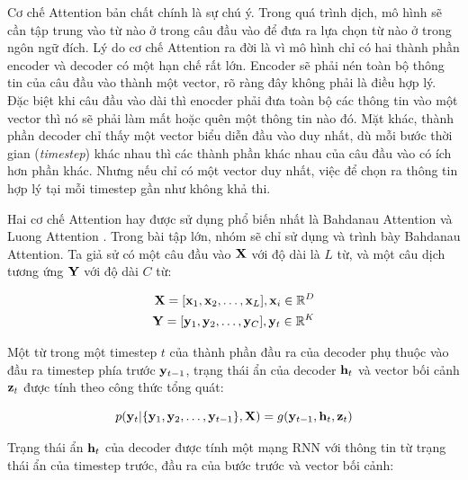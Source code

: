 \documentclass[14pt, a4paper]{article}
\numberwithin{equation}{section}
\numberwithin{algorithm}{section}
\numberwithin{figure}{section}
\numberwithin{table}{section}
\numberwithin{dl}{section}
\numberwithin{md}{section}
\numberwithin{bd}{section}
\numberwithin{dn}{section}
\numberwithin{hq}{section}
\begin{document}
    Cơ chế Attention bản chất chính là sự chú ý. Trong quá trình dịch, mô hình sẽ cần tập trung vào từ nào ở trong câu đầu vào để đưa ra lựa chọn từ nào ở trong ngôn ngữ đích.
    Lý do cơ chế Attention ra đời là vì mô hình chỉ có hai thành phần encoder và decoder có một hạn chế rất lớn. Encoder sẽ phải nén toàn bộ thông tin của câu đầu vào thành một vector, rõ ràng đây không phải là điều hợp lý.
    Đặc biệt khi câu đầu vào dài thì enocder phải đưa toàn bộ các thông tin vào một vector thì nó sẽ phải làm mất hoặc quên một thông tin nào đó.
    Mặt khác, thành phần decoder chỉ thấy một vector biểu diễn đầu vào duy nhất, dù mỗi bước thời gian (\textit{timestep}) khác nhau thì các thành phần khác nhau của câu đầu vào có ích hơn phần khác.
    Nhưng nếu chỉ có một vector duy nhất, việc để chọn ra thông tin hợp lý tại mỗi timestep gần như không khả thi.

    Hai cơ chế Attention hay được sử dụng phổ biến nhất là Bahdanau Attention \cite{bahdanau2014neural} và Luong Attention \cite{luong2014addressing}. Trong bài tập lớn, nhóm sẽ chỉ sử dụng và trình bày Bahdanau Attention.
    Ta giả sử có một câu đầu vào $\bold{X}$ với độ dài là $L$ từ, và một câu dịch tương ứng $\bold{Y}$ với độ dài $C$ từ:

    \begin{equation}
        \begin{aligned}
            \bold{X} = \lbrack \bold{x}_1, \bold{x}_2, \dots, \bold{x}_L \rbrack, \bold{x}_i \in \mathbb{R}^D \\
            \bold{Y} = \lbrack \bold{y}_1, \bold{y}_2, \dots, \bold{y}_C \rbrack, \bold{y}_t \in \mathbb{R}^K
        \end{aligned}
    \end{equation}

    Một từ trong một timestep $t$ của thành phần đầu ra của decoder phụ thuộc vào đầu ra timestep phía trước $\bold{y}_{t-1}$, trạng thái ẩn của decoder $\bold{h}_t$ và vector bối cảnh $\bold{z}_t$ được tính theo công thức tổng quát:

    \begin{equation}
        p(\bold{y}_t \vert \lbrace \bold{y}_1, \bold{y}_2, \dots, \bold{y}_{t-1} \rbrace, \bold{X}) = g(\bold{y}_{t-1}, \bold{h}_t, \bold{z}_t)
    \end{equation}

    Trạng thái ẩn $\bold{h}_t$ của decoder được tính một mạng RNN với thông tin từ trạng thái ẩn của timestep trước, đầu ra của bước trước và vector bối cảnh:
    
\end{document}

